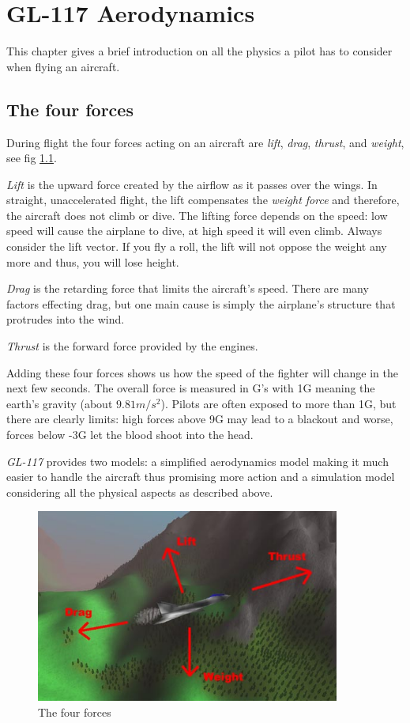 \chapter{GL-117 Aerodynamics}
\label{chap:aerodynamics}

This chapter gives a brief introduction on all the physics
a pilot has to consider when flying an aircraft.

\section{The four forces}
\label{sec:forces}

During flight the four forces acting on an aircraft are \textit{lift},
\textit{drag}, \textit{thrust}, and \textit{weight}, see fig \ref{fig:forces}.

\textit{Lift} is the upward force created by the airflow as it
passes over the wings.
In straight, unaccelerated flight, the lift compensates the
\textit{weight force} and therefore, the aircraft does not climb or dive.
The lifting force depends on the speed: low speed will cause the
airplane to dive, at high speed it will even climb.
Always consider the lift vector. If you fly a roll, the lift will not
oppose the weight any more and thus, you will lose height.

\textit{Drag} is the retarding force that limits the aircraft's speed.
There are many factors effecting drag, but one main cause
is simply the airplane's structure that protrudes into the wind.

\textit{Thrust} is the forward force provided by the engines.

Adding these four forces shows us how the speed of the fighter will change in the
next few seconds. The overall force is measured in G's with 1G meaning the
earth's gravity (about $9.81 m/s^2$). Pilots are often exposed to more than 1G, but
there are clearly limits: high forces above 9G may lead to a blackout and worse,
forces below -3G let the blood shoot into the head.

\emph{GL-117} provides two models: a simplified aerodynamics model making
it much easier to handle the aircraft thus promising more action
and a simulation model considering all the physical aspects as described above.

\begin{figure}
\begin{center}
\includegraphics[width=10cm]{forces.jpg}
\caption{The four forces}
\label{fig:forces}
\end{center}
\end{figure}



